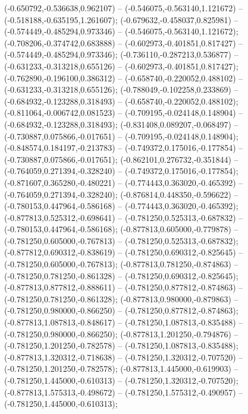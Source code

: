  (-0.650792,-0.536638,0.962107) -- (-0.546075,-0.563140,1.121672) -- (-0.518188,-0.635195,1.261607);
 (-0.679632,-0.458037,0.825981) -- (-0.574449,-0.485294,0.973346) -- (-0.546075,-0.563140,1.121672);
 (-0.708206,-0.374742,0.683888) -- (-0.602973,-0.401851,0.817427) -- (-0.574449,-0.485294,0.973346);
 (-0.736110,-0.287213,0.536877) -- (-0.631233,-0.313218,0.655126) -- (-0.602973,-0.401851,0.817427);
 (-0.762890,-0.196100,0.386312) -- (-0.658740,-0.220052,0.488102) -- (-0.631233,-0.313218,0.655126);
 (-0.788049,-0.102258,0.233869) -- (-0.684932,-0.123288,0.318493) -- (-0.658740,-0.220052,0.488102);
 (-0.811064,-0.006742,0.081523) -- (-0.709195,-0.024148,0.148904) -- (-0.684932,-0.123288,0.318493);
 (-0.831408,0.089207,-0.068497) -- (-0.730887,0.075866,-0.017651) -- (-0.709195,-0.024148,0.148904);
 (-0.848574,0.184197,-0.213783) -- (-0.749372,0.175016,-0.177854) -- (-0.730887,0.075866,-0.017651);
 (-0.862101,0.276732,-0.351844) -- (-0.764059,0.271394,-0.328240) -- (-0.749372,0.175016,-0.177854);
 (-0.871607,0.365280,-0.480221) -- (-0.774443,0.363020,-0.465392) -- (-0.764059,0.271394,-0.328240);
 (-0.876814,0.448350,-0.596622) -- (-0.780153,0.447964,-0.586168) -- (-0.774443,0.363020,-0.465392);
 (-0.877813,0.525312,-0.698641) -- (-0.781250,0.525313,-0.687832) -- (-0.780153,0.447964,-0.586168);
 (-0.877813,0.605000,-0.779878) -- (-0.781250,0.605000,-0.767813) -- (-0.781250,0.525313,-0.687832);
 (-0.877812,0.690312,-0.838619) -- (-0.781250,0.690312,-0.825645) -- (-0.781250,0.605000,-0.767813);
 (-0.877813,0.781250,-0.874863) -- (-0.781250,0.781250,-0.861328) -- (-0.781250,0.690312,-0.825645);
 (-0.877813,0.877812,-0.888611) -- (-0.781250,0.877812,-0.874863) -- (-0.781250,0.781250,-0.861328);
 (-0.877813,0.980000,-0.879863) -- (-0.781250,0.980000,-0.866250) -- (-0.781250,0.877812,-0.874863);
 (-0.877813,1.087813,-0.848617) -- (-0.781250,1.087813,-0.835488) -- (-0.781250,0.980000,-0.866250);
 (-0.877813,1.201250,-0.794876) -- (-0.781250,1.201250,-0.782578) -- (-0.781250,1.087813,-0.835488);
 (-0.877813,1.320312,-0.718638) -- (-0.781250,1.320312,-0.707520) -- (-0.781250,1.201250,-0.782578);
 (-0.877813,1.445000,-0.619903) -- (-0.781250,1.445000,-0.610313) -- (-0.781250,1.320312,-0.707520);
 (-0.877813,1.575313,-0.498672) -- (-0.781250,1.575312,-0.490957) -- (-0.781250,1.445000,-0.610313);
